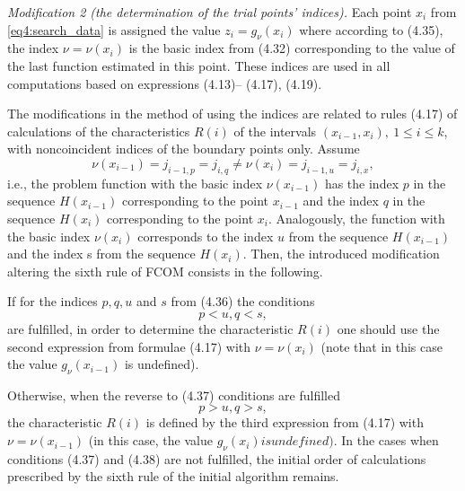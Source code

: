 \documentclass[graybox]{svmult}
\begin{document}
\emph{Modification 2 (the determination of the trial points’ indices).} Each point $x_i$ from \eqref{eq4:search_data} is assigned the value $z_i=g_\nu(x_i)$ where according to (4.35), the index $\nu=\nu(x_i)$ is the basic index from (4.32) corresponding to the value of the last function estimated in this point. These indices are used in all computations based on expressions (4.13)– (4.17), (4.19).

The modifications in the method of using the indices are related to rules (4.17) of calculations of the characteristics $R(i)$ of the intervals $(x_{i-1},x_i),\: 1\le i\le k$, with noncoincident
indices of the boundary points only. Assume
\begin{equation}
  \nu(x_{i-1})=j_{i-1,p}=j_{i,q}\not=\nu(x_i)=j_{i-1,u}=j_{i,x},
\end{equation}
i.e., the problem function with the basic index $\nu(x_{i-1})$ has the index $p$ in the sequence $H(x_{i-1})$ corresponding to the point $x_{i-1}$ and the index $q$ in the sequence $H(x_i)$ corresponding to the point $x_i$. Analogously, the function with the basic index $\nu(x_i)$ corresponds to the index $u$ from the sequence $H(x_{i-1})$ and the index s from the sequence $H(x_i)$. Then, the introduced modification altering the sixth rule of FCOM consists in the following.

If for the indices $p,q, u$ and $s$ from (4.36) the conditions
\begin{equation}
  p<u,q<s,
\end{equation}
are fulfilled, in order to determine the characteristic $R(i)$ one should use the second expression from formulae (4.17) with $\nu=\nu(x_i)$ (note that in this case the value $g_\nu(x_{i-1})$ is undefined).

Otherwise, when the reverse to (4.37) conditions are fulfilled
\begin{equation}
  p>u,q>s,
\end{equation}
the characteristic $R(i)$ is defined by the third expression from (4.17) with $\nu=\nu(x_{i-1})$ (in this
case, the value $g_\nu(x_i ) is undefined)$. In the cases when conditions (4.37) and (4.38) are not fulfilled, the initial order of calculations prescribed by the sixth rule of the initial algorithm remains.
\end{document}
